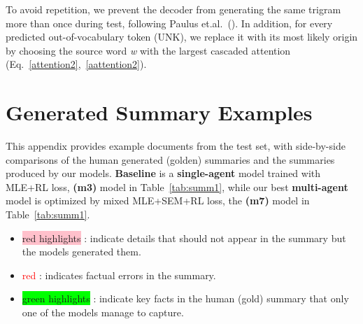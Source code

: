 \documentclass[11pt,a4paper]{article}
\begin{document}
To avoid repetition, we prevent the decoder from generating the same trigram more than once during test, following Paulus et.al.~(\citeyear{rlsummsocher}). In addition, for every predicted out-of-vocabulary token (UNK), we replace it with its most likely origin by choosing the source word \textit{w}
with the largest cascaded attention  (Eq.~\eqref{attention2},~\eqref{aattention2}).

\section{Generated Summary Examples}
\label{app:generations}
This appendix provides example documents from the test set, with side-by-side comparisons of the human generated (golden) summaries
and the summaries produced by our models. \textbf{Baseline} is a \textbf{single-agent} model trained with MLE+RL loss, \textbf{(m3)} model in Table~\ref{tab:summ1}, while our best \textbf{multi-agent} model is optimized by mixed MLE+SEM+RL loss, the \textbf{(m7)} model in Table~\ref{tab:summ1}. 

\begin{itemize}
    \item \colorbox{pink}{red highlights} : indicate details that should not appear in the summary but the models generated them.
    \item \textcolor{red}{red} : indicates factual errors in the summary.
    \item \colorbox{lime}{green highlights} : indicate key facts in the human (gold) summary that only one of the models manage to capture.
\end{itemize}
\end{document}
